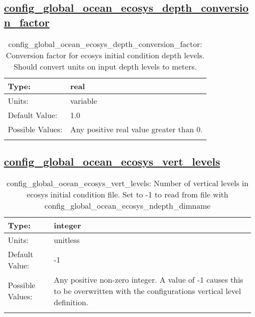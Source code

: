 \subsection[config\_global\_ocean\_ecosys\_depth\_conversion\_factor]{\hyperref[sec:nm_tab_global_ocean]{config\_global\_ocean\_ecosys\_depth\_conversion\_factor}}
\label{subsec:nm_sec_config_global_ocean_ecosys_depth_conversion_factor}
\begin{center}
\begin{longtable}{| p{2.0in} || p{4.0in} |}
    \hline
    Type: & real \\
    \hline
    Units: & \si{variable} \\
    \hline
    Default Value: & 1.0 \\
    \hline
    Possible Values: & Any positive real value greater than 0. \\
    \hline
    \caption{config\_global\_ocean\_ecosys\_depth\_conversion\_factor: Conversion factor for ecosys initial condition depth levels. Should convert units on input depth levels to meters.}
\end{longtable}
\end{center}
\subsection[config\_global\_ocean\_ecosys\_vert\_levels]{\hyperref[sec:nm_tab_global_ocean]{config\_global\_ocean\_ecosys\_vert\_levels}}
\label{subsec:nm_sec_config_global_ocean_ecosys_vert_levels}
\begin{center}
\begin{longtable}{| p{2.0in} || p{4.0in} |}
    \hline
    Type: & integer \\
    \hline
    Units: & \si{unitless} \\
    \hline
    Default Value: & -1 \\
    \hline
    Possible Values: & Any positive non-zero integer. A value of -1 causes this to be overwritten with the configurations vertical level definition. \\
    \hline
    \caption{config\_global\_ocean\_ecosys\_vert\_levels: Number of vertical levels in ecosys initial condition file.  Set to -1 to read from file with config\_global\_ocean\_ecosys\_ndepth\_dimname}
\end{longtable}
\end{center}

